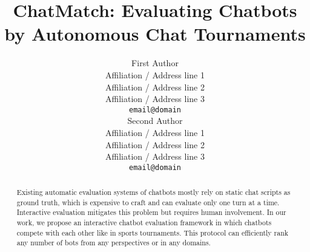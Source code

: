 \documentclass[11pt,a4paper]{article}
\title{ChatMatch: Evaluating Chatbots by Autonomous Chat Tournaments}
\author{First Author \\
  Affiliation / Address line 1 \\
  Affiliation / Address line 2 \\
  Affiliation / Address line 3 \\
  \texttt{email@domain} \\\And
  Second Author \\
  Affiliation / Address line 1 \\
  Affiliation / Address line 2 \\
  Affiliation / Address line 3 \\
  \texttt{email@domain} \\}
\date{}
\begin{document}
\maketitle
\begin{abstract}

Existing automatic evaluation systems of chatbots mostly rely on static chat 
scripts as ground truth, which is expensive to craft and can evaluate only one turn
at a time. Interactive evaluation mitigates this problem but requires human
involvement. In our work, we propose an interactive chatbot evaluation framework 
in which chatbots compete with each other like in sports tournaments. This protocol
can efficiently rank any number of bots from any perspectives or in any domains. 
\end{abstract}
















\end{document}
